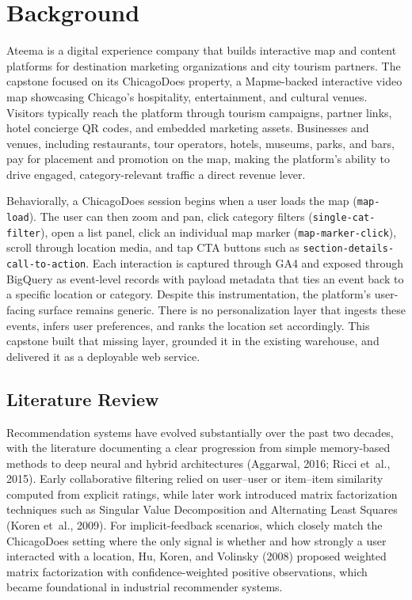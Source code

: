 \documentclass[12pt,letterpaper]{article}
\newcommand{\codeunderscore}{\discretionary{\textunderscore}{}{\textunderscore}}
\newcommand{\code}[1]{\begingroup\let\_\codeunderscore\texttt{\small #1}\endgroup}
\begin{document}
\section{Background}\label{sec:background}

Ateema is a digital experience company that builds interactive map and
content platforms for destination marketing organizations and city
tourism partners. The capstone focused on its ChicagoDoes property, a
Mapme-backed interactive video map showcasing Chicago's hospitality,
entertainment, and cultural venues. Visitors typically reach the
platform through tourism campaigns, partner links, hotel concierge QR
codes, and embedded marketing assets. Businesses and venues, including
restaurants, tour operators, hotels, museums, parks, and bars, pay for
placement and promotion on the map, making the platform's ability to
drive engaged, category-relevant traffic a direct revenue lever.

Behaviorally, a ChicagoDoes session begins when a user loads the map
(\code{map-load}). The user can then zoom and pan, click category
filters (\code{single-cat-filter}), open a list panel, click an
individual map marker (\code{map-marker-click}), scroll through
location media, and tap CTA buttons such as
\code{section-details-call-to-action}. Each interaction is captured
through GA4 and exposed through BigQuery as event-level records with
payload metadata that ties an event back to a specific location or
category. Despite this instrumentation, the platform's user-facing
surface remains generic. There is no personalization layer that
ingests these events, infers user preferences, and ranks the location
set accordingly. This capstone built that missing layer, grounded it
in the existing warehouse, and delivered it as a deployable web
service.

\subsection{Literature Review}\label{sec:lit}

Recommendation systems have evolved substantially over the past two
decades, with the literature documenting a clear progression from
simple memory-based methods to deep neural and hybrid architectures
(Aggarwal, 2016; Ricci et~al., 2015). Early collaborative filtering
relied on user--user or item--item similarity computed from explicit
ratings, while later work introduced matrix factorization techniques
such as Singular Value Decomposition and Alternating Least Squares
(Koren et~al., 2009). For implicit-feedback scenarios, which closely
match the ChicagoDoes setting where the only signal is whether and how
strongly a user interacted with a location, Hu, Koren, and Volinsky
(2008) proposed weighted matrix factorization with confidence-weighted
positive observations, which became foundational in industrial
recommender systems.
\end{document}
